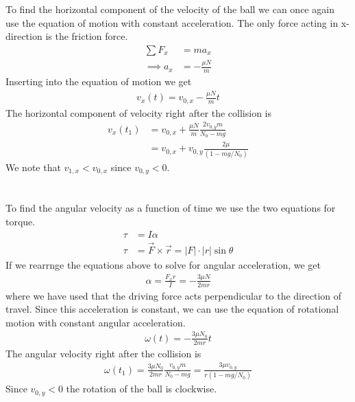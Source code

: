 \documentclass[a4paper,10pt,english]{article}
\begin{document}
\section{} \label{d}
To find the horizontal component of the velocity of the ball we can once again use the equation of motion with constant acceleration. The only force acting in x-direction is the friction force.
\begin{align*}
	\sum F_x &= m a_x \\
	\implies a_x &= -\frac{\mu N}{m}
\end{align*}
Inserting into the equation of motion we get
\begin{align}
	v_x (t) = v_{0, x} - \frac{\mu N}{m} t
\end{align}
The horizontal component of velocity right after the collision is
\begin{align*}
	v_x (t_1) &= v_{0, x} + \frac{\mu N}{m} \frac{2v_{0, y} m}{N_0 - mg} \\
	&= v_{0, x} + v_{0, y} \frac{2 \mu}{(1-mg/N_0)}
\end{align*}
We note that $v_{1, x} < v_{0, x}$ since $v_{0, y} < 0$.

\section{} \label{e}
To find the angular velocity as a function of time we use the two equations for torque.
\begin{align}
	\tau &= I \alpha \\
	\tau &= \vec{F} \times \vec{r} = |F| \cdot |r| \sin\theta
\end{align}
If we rearrnge the equations above to solve for angular acceleration, we get
\begin{align*}
	\alpha = \frac{F_x r}{I} = - \frac{3 \mu N}{2 m r}
\end{align*}
where we have used that the driving force acts perpendicular to the direction of travel. Since this acceleration is constant, we can use the equation of rotational motion with constant angular acceleration.
\begin{align}
	\omega (t) = - \frac{3 \mu N_0}{2 m r} t
\end{align}
The angular velocity right after the collision is
\begin{align*}
	\omega (t_1) = \frac{3 \mu N_0}{2 m r} \frac{v_{0, y} m}{N_0 - mg} = \frac{3 \mu v_{0, y}}{r (1 - mg/N_0)}
\end{align*}
Since $v_{0, y} < 0$ the rotation of the ball is clockwise.
\end{document}
